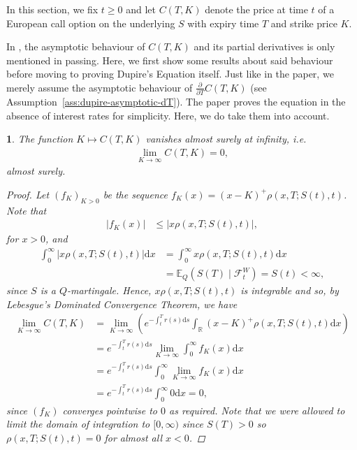 \documentclass[english]{article}
\numberwithin{equation}{section}
\numberwithin{figure}{section}
\theoremstyle{bolddescit}
\newtheorem{theorem}{\protect\theoremname}[section]
\theoremstyle{definition}
\theoremstyle{definition}
\theoremstyle{plain}
\theoremstyle{plain}
\theoremstyle{bolddesc}
\theoremstyle{plain}
\theoremstyle{remark}
\providecommand{\theoremname}{Theorem}
\begin{document}
In this section, we fix $t \ge 0$ and let $C(T,K)$ denote the price at time $t$ of a European call option on the underlying $S$ with expiry time $T$ and strike price $K$.

In \textcite{dupire_pricing_1993}, the asymptotic behaviour of $C(T,K)$ and its partial derivatives is only mentioned in passing. Here, we first show some results about said behaviour before moving to proving Dupire's Equation itself. Just like in the paper, we merely assume the asymptotic behaviour of $\frac{\partial}{\partial T} C(T,K)$ (see Assumption~\ref{ass:dupire-asymptotic-dT}). The paper proves the equation in the absence of interest rates for simplicity. Here, we do take them into account.

\begin{theorem}\label{thm:dupire-asymptotic}
  The function $K \mapsto C(T,K)$ vanishes almost surely at infinity, i.e.
  \begin{align*}
    \lim_{K \to \infty} C(T,K) = 0,
  \end{align*}
  almost surely.

  \begin{proof}
    Let $(f_K)_{K > 0}$ be the sequence $f_K(x) = (x-K)^+ \rho(x,T;S(t),t)$. Note that
    \begin{align*}
      |f_K(x)|
      &\le |x \rho(x,T;S(t),t)|,
    \end{align*}
    for $x > 0$, and
    \begin{align*}
      \int_0^\infty |x\rho(x,T;S(t),t)| \mathrm{d}x
      &= \int_0^\infty x\rho(x,T;S(t),t) \mathrm{d}x \tag{positive integrand}\\
      &= \mathbb{E}_Q(S(T) \mid \mathcal{F}^W_t)
      = S(t) < \infty,
    \end{align*}
    since $S$ is a $Q$-martingale. Hence, $x \rho(x,T;S(t),t)$ is integrable and so, by Lebesgue's Dominated Convergence Theorem, we have
    \begin{align*}
      \lim_{K \to \infty} C(T,K)
      &= \lim_{K \to \infty} \left(e^{-\int_t^T r(s) \mathrm{d}s} \int_\mathbb{R} (x-K)^+ \rho(x,T;S(t),t) \mathrm{d}x\right) \\
      &= e^{-\int_t^T r(s) \mathrm{d}s} \lim_{K \to \infty} \int_0^\infty f_K(x) \mathrm{d}x\\
      &= e^{-\int_t^T r(s) \mathrm{d}s} \int_0^\infty \lim_{K \to \infty} f_K(x) \mathrm{d}x\\
      &= e^{-\int_t^T r(s) \mathrm{d}s} \int_0^\infty 0 \mathrm{d}x = 0,
    \end{align*}
    since $(f_K)$ converges pointwise to $0$ as required. Note that we were allowed to limit the domain of integration to $[0,\infty)$ since $S(T) > 0$ so $\rho(x,T;S(t),t) = 0$ for almost all $x < 0$.
  \end{proof}
\end{theorem}
\end{document}

